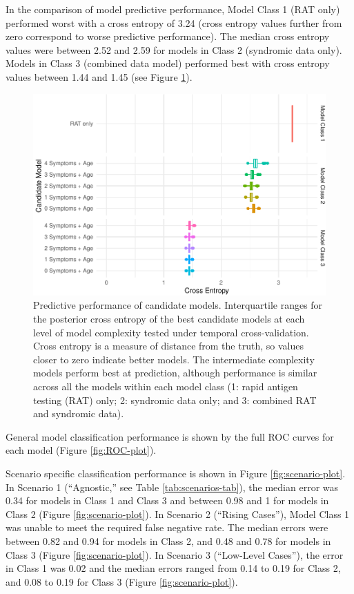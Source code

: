 \documentclass[]{elsarticle} %
\begin{document}
In the comparison of model predictive performance, Model Class 1 (RAT only) performed worst with a cross entropy of 3.24 (cross entropy values further from zero correspond to worse predictive performance).
The median cross entropy values were between 2.52 and 2.59 for models in Class 2 (syndromic data only).
Models in Class 3 (combined data model) performed best with cross entropy values between 1.44 and 1.45 (see Figure \ref{fig:pred-perf}).

\begin{figure}
\centering
\includegraphics{0501_MainText_files/figure-latex/pred-perf-1.pdf}
\caption{\label{fig:pred-perf}Predictive performance of candidate models. Interquartile ranges for the posterior cross entropy of the best candidate models at each level of model complexity tested under temporal cross-validation. Cross entropy is a measure of distance from the truth, so values closer to zero indicate better models. The intermediate complexity models perform best at prediction, although performance is similar across all the models within each model class (1: rapid antigen testing (RAT) only; 2: syndromic data only; and 3: combined RAT and syndromic data).}
\end{figure}

General model classification performance is shown by the full ROC curves for each model (Figure \ref{fig:ROC-plot}).

Scenario specific classification performance is shown in Figure \ref{fig:scenario-plot}.
In Scenario 1 (``Agnostic,'' see Table \ref{tab:scenarios-tab}), the median error was 0.34 for models in Class 1 and Class 3 and between 0.98 and 1 for models in Class 2 (Figure \ref{fig:scenario-plot}).
In Scenario 2 (``Rising Cases''), Model Class 1 was unable to meet the required false negative rate.
The median errors were between
0.82 and
0.94 for models in Class 2, and
0.48 and
0.78 for models in Class 3 (Figure \ref{fig:scenario-plot}).
In Scenario 3 (``Low-Level Cases''), the error in Class 1 was 0.02 and the median errors ranged from 0.14 to 0.19 for Class 2, and 0.08 to 0.19 for Class 3 (Figure \ref{fig:scenario-plot}).
\end{document}
